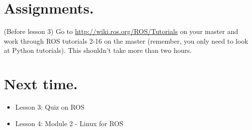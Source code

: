 \documentclass{handout}
\begin{document}
\section{Assignments.}
	\begin{todolist}
		\item (Before lesson 3) Go to \url{http://wiki.ros.org/ROS/Tutorials} on your master and work through ROS tutorials 2-16 on the master (remember, you only need to look at Python tutorials). This shouldn't take more than two hours.
	\end{todolist}

\section{Next time.}
	\begin{itemize}
		\item Lesson 3: Quiz on ROS
		\item Lesson 4: Module 2 - Linux for ROS
	\end{itemize}
\end{document}
